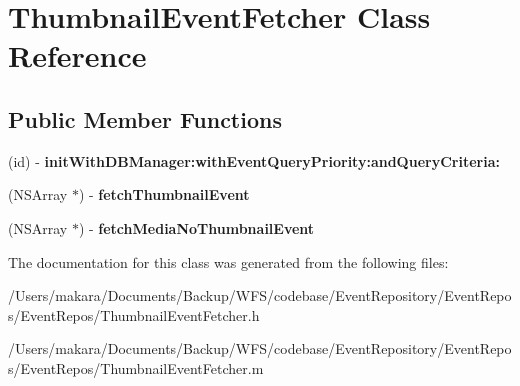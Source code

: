 \hypertarget{interface_thumbnail_event_fetcher}{
\section{\-Thumbnail\-Event\-Fetcher \-Class \-Reference}
\label{interface_thumbnail_event_fetcher}
}
\subsection*{\-Public \-Member \-Functions}
\begin{DoxyCompactItemize}
\item 
\hypertarget{interface_thumbnail_event_fetcher_a0bc8b013073aa6f33df452c135d1c992}{
(id) -\/ {\bfseries init\-With\-D\-B\-Manager\-:with\-Event\-Query\-Priority\-:and\-Query\-Criteria\-:}}
\label{interface_thumbnail_event_fetcher_a0bc8b013073aa6f33df452c135d1c992}

\item 
\hypertarget{interface_thumbnail_event_fetcher_a3f5631c66caed144a81819ff1c1ddf4d}{
(\-N\-S\-Array $\ast$) -\/ {\bfseries fetch\-Thumbnail\-Event}}
\label{interface_thumbnail_event_fetcher_a3f5631c66caed144a81819ff1c1ddf4d}

\item 
\hypertarget{interface_thumbnail_event_fetcher_ad274c3276cb9080b79399ad1423ee7c3}{
(\-N\-S\-Array $\ast$) -\/ {\bfseries fetch\-Media\-No\-Thumbnail\-Event}}
\label{interface_thumbnail_event_fetcher_ad274c3276cb9080b79399ad1423ee7c3}

\end{DoxyCompactItemize}


\-The documentation for this class was generated from the following files\-:\begin{DoxyCompactItemize}
\item 
/\-Users/makara/\-Documents/\-Backup/\-W\-F\-S/codebase/\-Event\-Repository/\-Event\-Repos/\-Event\-Repos/\-Thumbnail\-Event\-Fetcher.\-h\item 
/\-Users/makara/\-Documents/\-Backup/\-W\-F\-S/codebase/\-Event\-Repository/\-Event\-Repos/\-Event\-Repos/\-Thumbnail\-Event\-Fetcher.\-m\end{DoxyCompactItemize}

